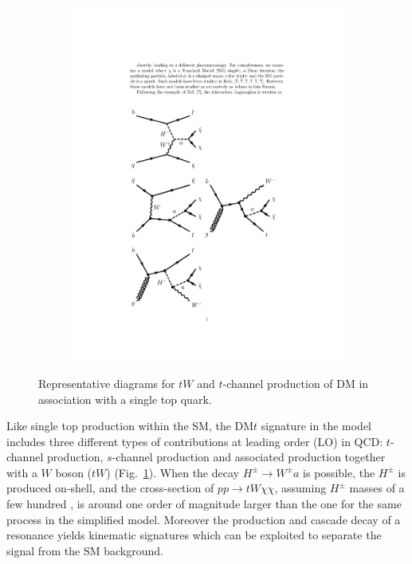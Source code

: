 \begin{figure}
\begin{center}
\begin{subfigure}{.23\textwidth}
\includegraphics[width=\textwidth]{texinputs/04_grid/figures/DMHF/Pfeyn_tchan_2}
\caption{}
\end{subfigure}
\caption{Representative diagrams for $tW$ and $t$-channel production of DM in association with a single top quark.}
\label{fig:feyn1}
\end{center}
\end{figure}

Like single top production within the SM, the DM$t$ signature in the model includes three different types of contributions at leading order (LO) in QCD: $t$-channel production, $s$-channel production and associated production together with a $W$ boson ($tW$) (Fig.~\ref{fig:feyn1}).
When the decay $H^{\pm}\rightarrow W^{\pm} a$ is possible, the $H^{\pm}$ is produced on-shell, and the cross-section of $pp \rightarrow tW\chi\chi$, 
assuming $H^{\pm}$ masses of a few hundred \GeV, is around one order of magnitude larger than the one for the same process in the simplified model. Moreover the production and cascade decay of a resonance yields kinematic signatures which can be exploited to separate the signal from the SM background. 


